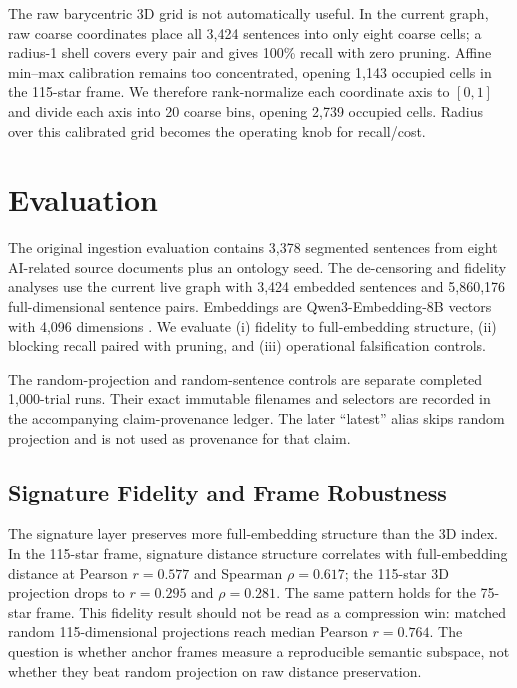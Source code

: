 \documentclass[11pt]{article}
\begin{document}
The raw barycentric 3D grid is not automatically useful. In the current graph, raw coarse coordinates place all 3,424 sentences into only eight coarse cells; a radius-1 shell covers every pair and gives 100\% recall with zero pruning. Affine min--max calibration remains too concentrated, opening 1,143 occupied cells in the 115-star frame. We therefore rank-normalize each coordinate axis to $[0,1]$ and divide each axis into 20 coarse bins, opening 2,739 occupied cells. Radius over this calibrated grid becomes the operating knob for recall/cost.

\section{Evaluation}
\label{sec:evaluation}

The original ingestion evaluation contains 3,378 segmented sentences from eight AI-related source documents plus an ontology seed. The de-censoring and fidelity analyses use the current live graph with 3,424 embedded sentences and 5,860,176 full-dimensional sentence pairs. Embeddings are Qwen3-Embedding-8B vectors with 4,096 dimensions \citep{zhang2025qwen3embedding}. We evaluate (i) fidelity to full-embedding structure, (ii) blocking recall paired with pruning, and (iii) operational falsification controls.

The random-projection and random-sentence controls are separate completed 1,000-trial runs. Their exact immutable filenames and selectors are recorded in the accompanying claim-provenance ledger. The later ``latest'' alias skips random projection and is not used as provenance for that claim.

\subsection{Signature Fidelity and Frame Robustness}

The signature layer preserves more full-embedding structure than the 3D index. In the 115-star frame, signature distance structure correlates with full-embedding distance at Pearson $r=0.577$ and Spearman $\rho=0.617$; the 115-star 3D projection drops to $r=0.295$ and $\rho=0.281$. The same pattern holds for the 75-star frame. This fidelity result should not be read as a compression win: matched random 115-dimensional projections reach median Pearson $r=0.764$. The question is whether anchor frames measure a reproducible semantic subspace, not whether they beat random projection on raw distance preservation.
\end{document}
